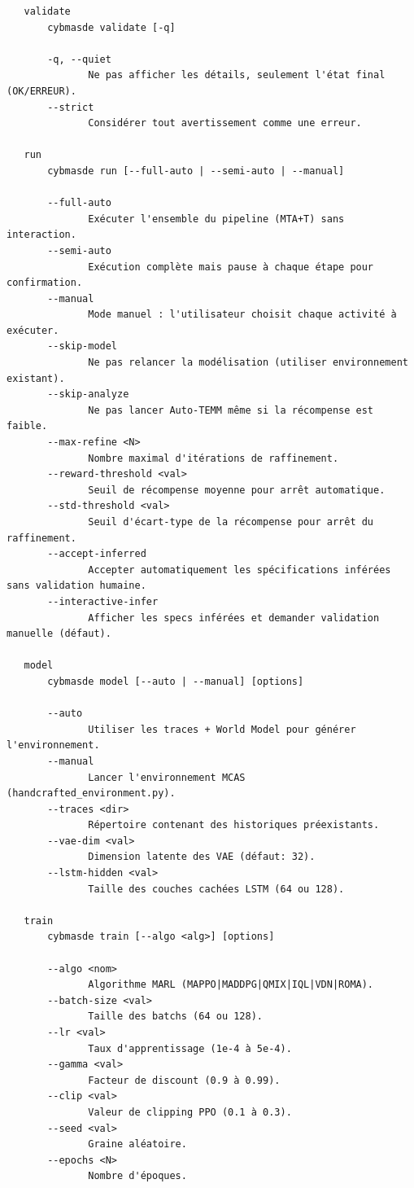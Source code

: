 \begin{verbatim}
   validate
       cybmasde validate [-q]

       -q, --quiet
              Ne pas afficher les détails, seulement l'état final (OK/ERREUR).
       --strict
              Considérer tout avertissement comme une erreur.

   run
       cybmasde run [--full-auto | --semi-auto | --manual]

       --full-auto
              Exécuter l'ensemble du pipeline (MTA+T) sans interaction.
       --semi-auto
              Exécution complète mais pause à chaque étape pour confirmation.
       --manual
              Mode manuel : l'utilisateur choisit chaque activité à exécuter.
       --skip-model
              Ne pas relancer la modélisation (utiliser environnement existant).
       --skip-analyze
              Ne pas lancer Auto-TEMM même si la récompense est faible.
       --max-refine <N>
              Nombre maximal d'itérations de raffinement.
       --reward-threshold <val>
              Seuil de récompense moyenne pour arrêt automatique.
       --std-threshold <val>
              Seuil d'écart-type de la récompense pour arrêt du raffinement.
       --accept-inferred
              Accepter automatiquement les spécifications inférées sans validation humaine.
       --interactive-infer
              Afficher les specs inférées et demander validation manuelle (défaut).

   model
       cybmasde model [--auto | --manual] [options]

       --auto
              Utiliser les traces + World Model pour générer l'environnement.
       --manual
              Lancer l'environnement MCAS (handcrafted_environment.py).
       --traces <dir>
              Répertoire contenant des historiques préexistants.
       --vae-dim <val>
              Dimension latente des VAE (défaut: 32).
       --lstm-hidden <val>
              Taille des couches cachées LSTM (64 ou 128).

   train
       cybmasde train [--algo <alg>] [options]

       --algo <nom>
              Algorithme MARL (MAPPO|MADDPG|QMIX|IQL|VDN|ROMA).
       --batch-size <val>
              Taille des batchs (64 ou 128).
       --lr <val>
              Taux d'apprentissage (1e-4 à 5e-4).
       --gamma <val>
              Facteur de discount (0.9 à 0.99).
       --clip <val>
              Valeur de clipping PPO (0.1 à 0.3).
       --seed <val>
              Graine aléatoire.
       --epochs <N>
              Nombre d'époques.


\end{verbatim}
